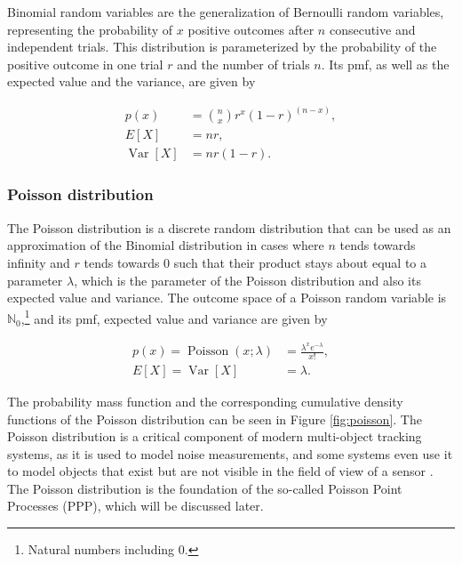 Binomial random variables are the generalization of Bernoulli random variables,
representing the probability of $x$ positive outcomes after $n$ consecutive and
independent trials. This distribution is parameterized by the probability of the
positive outcome in one trial $r$ and the number of trials $n$. Its pmf, as well 
as the expected value and the variance, are given by

$$
\begin{aligned}
    p(x) &= \binom{n}{x} r^x (1-r)^{(n-x)}, \\
    E[X] &= nr, \\
    \operatorname{Var}[X] &= nr(1-r).
\end{aligned}
$$

\subsubsection{Poisson distribution}

The Poisson distribution is a discrete random distribution that can 
be used as an approximation of the Binomial distribution in cases where 
$n$ tends towards infinity and $r$ tends towards $0$ such that their 
product stays about equal to a parameter $\lambda$, which is the 
parameter of the Poisson distribution and also its expected value and 
variance. The outcome space of a Poisson random variable is 
$\mathbb{N}_0$,\footnote{Natural numbers including $0$.} and its pmf,
expected value and variance are given by

$$
\begin{aligned}
    p(x) = \operatorname{Poisson}(x; \lambda) &= \frac{\lambda^x e^{-\lambda}}{x !}, \\
    E[X] = \operatorname{Var}[X] &= \lambda.
\end{aligned}
$$

The probability mass function and the corresponding cumulative density functions
of the Poisson distribution can be seen in Figure \ref{fig:poisson}.
The Poisson distribution is a critical component of modern multi-object
tracking systems, as it is used to model noise measurements, and some 
systems even use it to model objects that exist but are not visible in
the field of view of a sensor \cite{garcia-fernandezPoissonMultiBernoulliMixture2018}.
The Poisson distribution is the foundation of the so-called Poisson Point
Processes (PPP), which will be discussed later.

